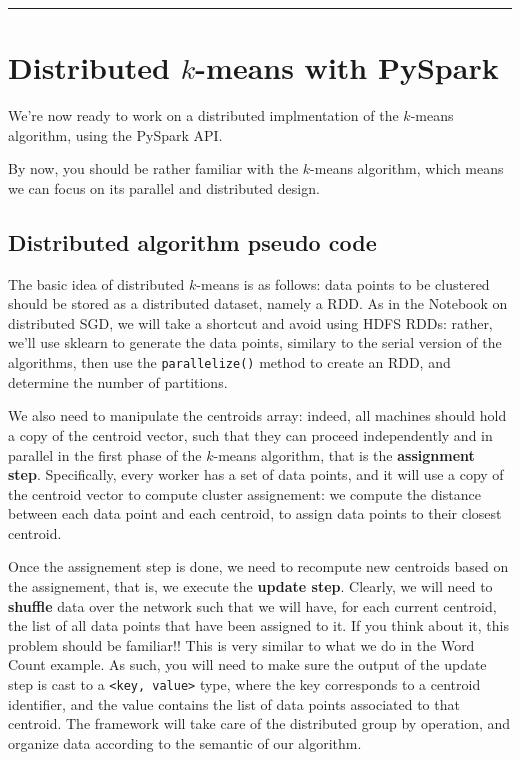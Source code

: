 \documentclass[11pt]{article}
\begin{document}
 

    \begin{center}\rule{0.5\linewidth}{\linethickness}\end{center}

    \hypertarget{distributed-k-means-with-pyspark}{%
\section{\texorpdfstring{Distributed \(k\)-means with
PySpark}{Distributed k-means with PySpark}}\label{distributed-k-means-with-pyspark}}

We're now ready to work on a distributed implmentation of the
\(k\)-means algorithm, using the PySpark API.

By now, you should be rather familiar with the \(k\)-means algorithm,
which means we can focus on its parallel and distributed design.

    \hypertarget{distributed-algorithm-pseudo-code}{%
\subsection{Distributed algorithm pseudo
code}\label{distributed-algorithm-pseudo-code}}

The basic idea of distributed \(k\)-means is as follows: data points to
be clustered should be stored as a distributed dataset, namely a RDD. As
in the Notebook on distributed SGD, we will take a shortcut and avoid
using HDFS RDDs: rather, we'll use sklearn to generate the data points,
similary to the serial version of the algorithms, then use the
\texttt{parallelize()} method to create an RDD, and determine the number
of partitions.

We also need to manipulate the centroids array: indeed, all machines
should hold a copy of the centroid vector, such that they can proceed
independently and in parallel in the first phase of the \(k\)-means
algorithm, that is the \textbf{assignment step}. Specifically, every
worker has a set of data points, and it will use a copy of the centroid
vector to compute cluster assignement: we compute the distance between
each data point and each centroid, to assign data points to their
closest centroid.

Once the assignement step is done, we need to recompute new centroids
based on the assignement, that is, we execute the \textbf{update step}.
Clearly, we will need to \textbf{shuffle} data over the network such
that we will have, for each current centroid, the list of all data
points that have been assigned to it. If you think about it, this
problem should be familiar!! This is very similar to what we do in the
Word Count example. As such, you will need to make sure the output of
the update step is cast to a
\texttt{\textless{}key,\ value\textgreater{}} type, where the key
corresponds to a centroid identifier, and the value contains the list of
data points associated to that centroid. The framework will take care of
the distributed group by operation, and organize data according to the
semantic of our algorithm.
\end{document}
